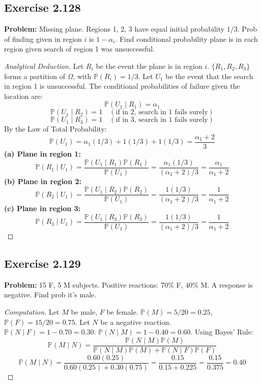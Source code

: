\documentclass[12pt]{article}
\theoremstyle{definition}
\theoremstyle{remark}
\newcommand{\Pbb}{\mathbb{P}}
\newcommand{\OmegaSet}{\Omega}
\begin{document}
\subsection*{Exercise 2.128}
\textbf{Problem:} Missing plane. Regions 1, 2, 3 have equal initial probability $1/3$. Prob of finding given in region $i$ is $1 - \alpha_i$. Find conditional probability plane is in each region given search of region 1 was unsuccessful.
\begin{proof}[Analytical Deduction]
Let $R_i$ be the event the plane is in region $i$. $\{R_1, R_2, R_3\}$ forms a partition of $\OmegaSet$, with $\Pbb(R_i) = 1/3$.
Let $U_1$ be the event that the search in region 1 is unsuccessful.
The conditional probabilities of failure given the location are:
\[ \Pbb(U_1 \mid R_1) = \alpha_1 \]
\[ \Pbb(U_1 \mid R_2) = 1 \quad (\text{if in 2, search in 1 fails surely}) \]
\[ \Pbb(U_1 \mid R_3) = 1 \quad (\text{if in 3, search in 1 fails surely}) \]
By the Law of Total Probability:
\[ \Pbb(U_1) = \alpha_1(1/3) + 1(1/3) + 1(1/3) = \frac{\alpha_1 + 2}{3} \]
\textbf{(a) Plane in region 1:}
\[ \Pbb(R_1 \mid U_1) = \frac{\Pbb(U_1 \mid R_1)\Pbb(R_1)}{\Pbb(U_1)} = \frac{\alpha_1(1/3)}{(\alpha_1 + 2)/3} = \frac{\alpha_1}{\alpha_1 + 2} \]
\textbf{(b) Plane in region 2:}
\[ \Pbb(R_2 \mid U_1) = \frac{\Pbb(U_1 \mid R_2)\Pbb(R_2)}{\Pbb(U_1)} = \frac{1(1/3)}{(\alpha_1 + 2)/3} = \frac{1}{\alpha_1 + 2} \]
\textbf{(c) Plane in region 3:}
\[ \Pbb(R_3 \mid U_1) = \frac{\Pbb(U_1 \mid R_3)\Pbb(R_3)}{\Pbb(U_1)} = \frac{1(1/3)}{(\alpha_1 + 2)/3} = \frac{1}{\alpha_1 + 2} \]
\end{proof}

\subsection*{Exercise 2.129}
\textbf{Problem:} 15 F, 5 M subjects. Positive reactions: 70\% F, 40\% M. A response is negative. Find prob it's male.
\begin{proof}[Computation]
Let $M$ be male, $F$ be female. $\Pbb(M) = 5/20 = 0.25$, $\Pbb(F) = 15/20 = 0.75$.
Let $N$ be a negative reaction. $\Pbb(N \mid F) = 1 - 0.70 = 0.30$. $\Pbb(N \mid M) = 1 - 0.40 = 0.60$.
Using Bayes' Rule:
\[ \Pbb(M \mid N) = \frac{\Pbb(N \mid M)\Pbb(M)}{\Pbb(N \mid M)\Pbb(M) + \Pbb(N \mid F)\Pbb(F)} \]
\[ \Pbb(M \mid N) = \frac{0.60(0.25)}{0.60(0.25) + 0.30(0.75)} = \frac{0.15}{0.15 + 0.225} = \frac{0.15}{0.375} = 0.40 \]
\end{proof}
\end{document}
